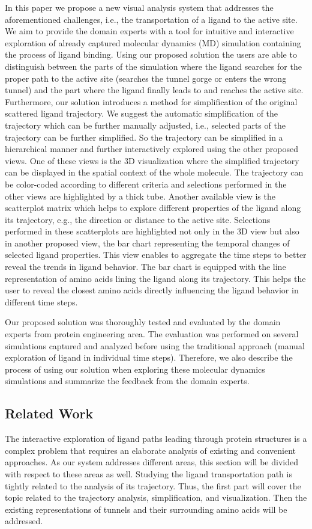 \documentclass[twocolumn]{bmcart}%
\begin{document}
In this paper we propose a new visual analysis system that addresses the aforementioned challenges, i.e., the transportation of a ligand to the active site. 
We aim to provide the domain experts with a tool for intuitive and interactive exploration of already captured molecular dynamics (MD) simulation containing the process of ligand binding. 
Using our proposed solution the users are able to distinguish between the parts of the simulation where the ligand searches for the proper path to the active site (searches the tunnel gorge or enters the wrong tunnel) and the part where the ligand finally leads to and reaches the active site.
Furthermore, our solution introduces a method for simplification of the original scattered ligand trajectory.
We suggest the automatic simplification of the trajectory which can be further manually adjusted, i.e., selected parts of the trajectory can be further simplified.
So the trajectory can be simplified in a hierarchical manner and further interactively explored using the other proposed views.
One of these views is the 3D visualization where the simplified trajectory can be displayed in the spatial context of the whole molecule.
The trajectory can be color-coded according to different criteria and selections performed in the other views are highlighted by a thick tube.
Another available view is the scatterplot matrix which helps to explore different properties of the ligand along its trajectory, e.g., the direction or distance to the active site. 
Selections performed in these scatterplots are highlighted not only in the 3D view but also in another proposed view, the bar chart representing the temporal changes of selected ligand properties. 
This view enables to aggregate the time steps to better reveal the trends in ligand behavior.
The bar chart is equipped with the line representation of amino acids lining the ligand along its trajectory. 
This helps the user to reveal the closest amino acids directly influencing the ligand behavior in different time steps.

Our proposed solution was thoroughly tested and evaluated by the domain experts from protein engineering area.
The evaluation was performed on several simulations captured and analyzed before using the traditional approach (manual exploration of ligand in individual time steps). 
Therefore, we also describe the process of using our solution when exploring these molecular dynamics simulations and summarize the feedback from the domain experts.

\subsection*{Related Work}
The interactive exploration of ligand paths leading through protein structures is a complex problem that requires an elaborate analysis of existing and convenient approaches.
As our system addresses different areas, this section will be divided with respect to these areas as well. 
Studying the ligand transportation path is tightly related to the analysis of its trajectory.
Thus, the first part will cover the topic related to the trajectory analysis, simplification, and visualization.
Then the existing representations of tunnels and their surrounding amino acids will be addressed.
\end{document}
